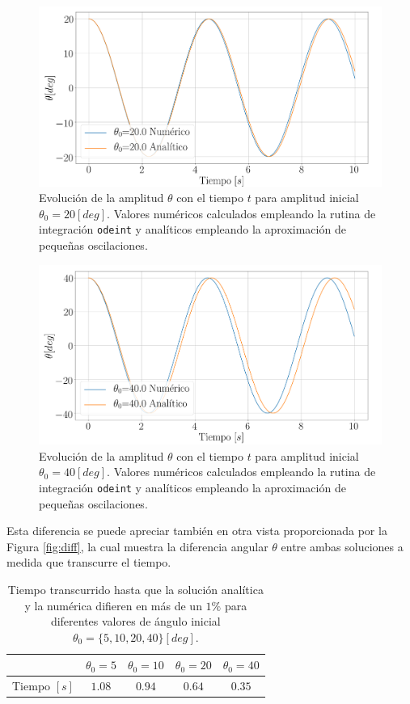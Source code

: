 \documentclass[journal]{IEEEtran}
\begin{document}
\begin{figure}[!htb]
  \centering
  \includegraphics[width=\linewidth]{theta_20_diff}
  \caption{Evolución de la amplitud $\theta$ con el tiempo $t$ para amplitud inicial $\theta_0 = 20 [deg]$. Valores numéricos calculados empleando la rutina de integración \texttt{odeint} y analíticos empleando la aproximación de pequeñas oscilaciones.}
  \label{fig:numanal_20}
\end{figure}
\begin{figure}[!htb]
  \centering
  \includegraphics[width=\linewidth]{theta_40_diff}
  \caption{Evolución de la amplitud $\theta$ con el tiempo $t$ para amplitud inicial $\theta_0 = 40 [deg]$. Valores numéricos calculados empleando la rutina de integración \texttt{odeint} y analíticos empleando la aproximación de pequeñas oscilaciones.}
  \label{fig:numanal_40}
\end{figure}


Esta diferencia se puede apreciar también en otra vista proporcionada por la Figura \ref{fig:diff}, la cual muestra la diferencia angular $\theta$ entre ambas soluciones a medida que transcurre el tiempo.

\begin{table}[!htb]
  \centering
  \begin{tabular}{c|cccc}
    & $\theta_0 = 5$ & $\theta_0 = 10$ & $\theta_0 = 20$ & $\theta_0 = 40$\\
    \hline
    Tiempo $[s]$ & $1.08$ & $0.94$ & $0.64$ & $0.35$\\
    \hline
  \end{tabular}
  \caption{Tiempo transcurrido hasta que la solución analítica y la numérica difieren en más de un $1\%$ para diferentes valores de ángulo inicial $\theta_0 = \{5, 10, 20, 40\} [deg]$.}
  \label{table:tiempodiff}
\end{table}
\end{document}

